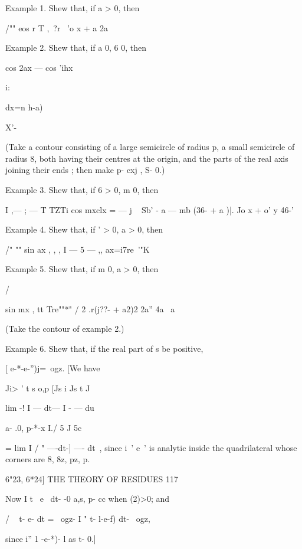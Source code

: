 Example 1. Shew that, if a > 0, then

/"" eos r T ,\ ?r \ 'o x + a 2a





Example 2. Shew that, if a 0, 6 0, then

cos 2ax — cos 'ihx



i:



dx=n h-a)



X'-

(Take a contour consisting of a large semicircle of radius p, a small
semicircle of radius 8, both having their centres at the origin, and
the parts of the real axis joining their ends ; then make p- cxj , S-
0.)

Example 3. Shew that, if 6 > 0, m 0, then

I ,— ; — T TZTi cos mxclx = — j ~ Sb' - a — mb (36- + a )|. Jo x + o'
y 46-'

Example 4. Shew that, if ' > 0, a > 0, then

/" "" sin ax , , , I — 5 — ,, ax=i7re~'"K

Example 5. Shew that, if m 0, a > 0, then



/



sin mx , tt Tre""*" / 2 .r(j??- + a2)2 2a'' 4a \ a



(Take the contour of example 2.)

Example 6. Shew that, if the real part of s be positive,

[ e-*-e-'')j=\ ogz. [We have

Ji> ' t s o,p [Js i Js t J

lim -! I — dt— I - — du



a- .0, p-*-x I./ 5 J 5c

= lim I / " —-dt-] —- dt\ , since i~' e~' is analytic inside the
quadrilateral whose corners are 8, 8z, pz, p.



6"23, 6*24] THE THEORY OF RESIDUES 117

Now I t~ e~ dt- -0 a,s, p- cc when (2)>0; and

/ ~ t- e- dt = \ ogz- I " t- l-e-f) dt- \ ogz,

since i'' 1 -e-*)- l as t- 0.]


